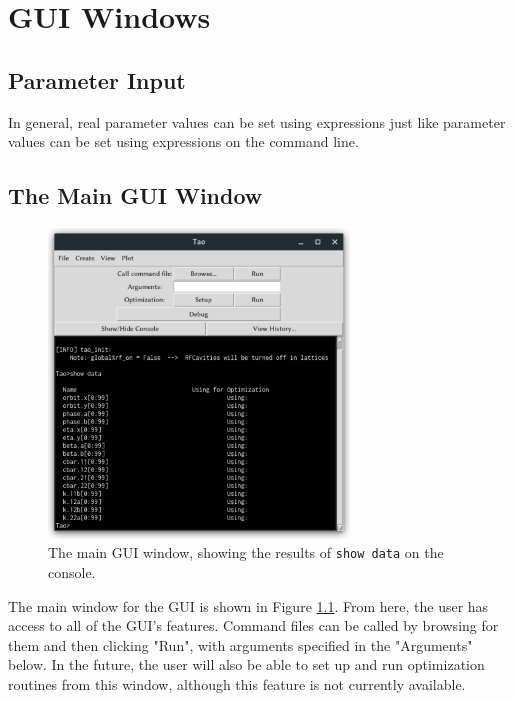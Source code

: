 \chapter{GUI Windows}

\section{Parameter Input}
\label{s:param.input}

In general, real parameter values can be set using expressions just like parameter values can be set
using expressions on the \tao command line.

\section{The Main GUI Window}
\label{s:gui.root.window}

\begin{figure}
\centering
\includegraphics[width=8cm]{figures/root_window.pdf}
\caption[The main GUI window.]{The main GUI window, showing the results of \texttt{show data} on the console.}
\label{fig:root.window}
\end{figure}

The main window for the GUI is shown in Figure \ref{fig:root.window}.
From here, the user has access to all of the GUI's features.
Command files can be called by browsing for them and then clicking "Run", with arguments specified in the "Arguments" below.
In the future, the user will also be able to set up and run optimization routines from this window, although this feature is not currently available.

